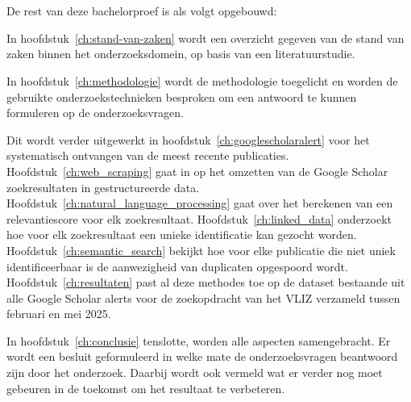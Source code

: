 \section{}%
\label{sec:opzet-bachelorproef}


De rest van deze bachelorproef is als volgt opgebouwd:

In hoofdstuk~\ref{ch:stand-van-zaken} wordt een overzicht gegeven van de stand van zaken binnen het onderzoeksdomein, op basis van een literatuurstudie.

In hoofdstuk~\ref{ch:methodologie} wordt de methodologie toegelicht en worden de gebruikte onderzoekstechnieken besproken om een antwoord te kunnen formuleren op de onderzoeksvragen.

Dit wordt verder uitgewerkt in hoofdstuk~\ref{ch:googlescholaralert} voor het systematisch ontvangen van de meest recente publicaties. Hoofdstuk~\ref{ch:web_scraping} gaat in op het omzetten van de Google Scholar zoekresultaten in gestructureerde data. Hoofdstuk~\ref{ch:natural_language_processing} gaat over het berekenen van een relevantiescore voor elk zoekresultaat. Hoofdstuk~\ref{ch:linked_data} onderzoekt hoe voor elk zoekresultaat een unieke identificatie kan gezocht worden. Hoofdstuk~\ref{ch:semantic_search} bekijkt hoe voor elke publicatie die niet uniek identificeerbaar is de aanwezigheid van duplicaten opgespoord wordt. Hoofdstuk~\ref{ch:resultaten} past al deze methodes toe op de dataset bestaande uit alle Google Scholar alerts voor de zoekopdracht van het VLIZ verzameld tussen februari en mei 2025.


In hoofdstuk~\ref{ch:conclusie} tenslotte, worden alle aspecten samengebracht. Er wordt een besluit geformuleerd in welke mate de onderzoeksvragen beantwoord zijn door het onderzoek. Daarbij wordt ook vermeld wat er verder nog moet gebeuren in de toekomst om het resultaat te verbeteren.